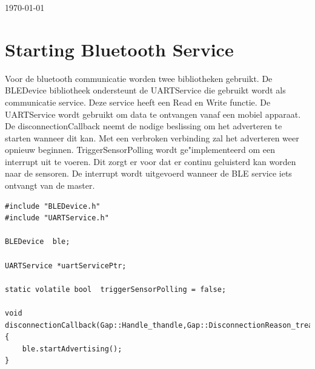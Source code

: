 \documentclass[12pt,a4paper]{report}
\begin{document}
\begin{titlepage}


{\large \today}\\[3cm] %


 

\vfill %

\end{titlepage}

\section{Starting Bluetooth Service}
Voor de bluetooth communicatie worden twee bibliotheken gebruikt. De BLEDevice bibliotheek ondersteunt de UARTService die gebruikt wordt als communicatie service. Deze service heeft een Read en Write functie. De UARTService wordt gebruikt om data te ontvangen vanaf een mobiel apparaat. De disconnectionCallback neemt de nodige beslissing om het adverteren te starten wanneer dit kan. Met een verbroken verbinding zal het adverteren weer opnieuw beginnen. TriggerSensorPolling wordt ge"implementeerd om een interrupt uit te voeren. Dit zorgt er voor dat er continu geluisterd kan worden naar de sensoren. De interrupt wordt uitgevoerd wanneer de BLE service iets ontvangt van de master.\\

\begin{lstlisting}
#include "BLEDevice.h"
#include "UARTService.h"

BLEDevice  ble;                                                             

UARTService *uartServicePtr;

static volatile bool  triggerSensorPolling = false;

void disconnectionCallback(Gap::Handle_thandle,Gap::DisconnectionReason_treason)
{
    ble.startAdvertising();
}

\end{lstlisting}
\newpage
\end{document}
